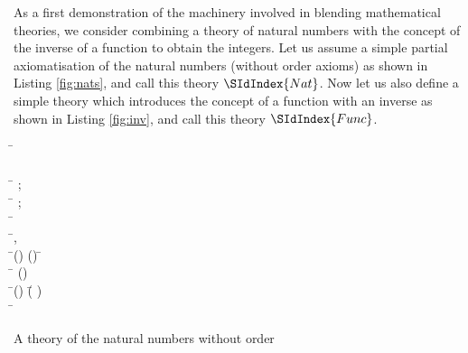 As a first demonstration of the machinery involved in blending
mathematical theories, we consider combining a theory of natural
numbers with the concept of the inverse of a function to obtain the
integers. Let us assume a simple partial axiomatisation of the natural
numbers (without order axioms) as shown in Listing \ref{fig:nats}, and
call this theory $\SIdIndex{Nat}$. Now let us also define a simple theory
which introduces the concept of a function with an inverse as shown in
Listing \ref{fig:inv}, and call this theory $\SIdIndex{Func}$. 
\begin{listing}[!ht]
\begin{mdframed}
\begin{hetcasl}
\SPEC \= \Ax{=}\\
\> \SORT {}\\
\> \OPS \= \Ax{:} ;\\
\>\>  \Ax{:} \= \Ax{\rightarrow} ;\\
\>\> \Ax{\_\_}\Ax{+}\Ax{\_\_} \Ax{:} \= \Ax{\times}  \Ax{\rightarrow} \\
\> \Ax{\forall} \=,  \Ax{:}  \\
\> \Ax{\bullet} \=() \Ax{=} () \Ax{\Rightarrow} \= \Ax{=} \\
\> \Ax{\bullet} \Ax{\neg} \= \Ax{=} () \\
\> \Ax{\bullet} \=() \Ax{+}  \Ax{=} (\= \Ax{+} )\\
\> \Ax{\bullet} \= \Ax{+}  \Ax{=} \\
\end{hetcasl}
\end{mdframed}
\caption{A theory of the natural numbers without order}
\label{fig:nats}
\end{listing}

